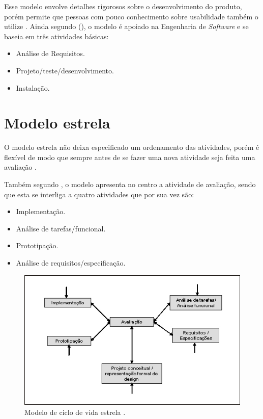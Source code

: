   Esse modelo envolve detalhes rigorosos sobre o desenvolvimento do produto, porém permite que pessoas com pouco conhecimento sobre usabilidade também o utilize \cite{ihc}. 
  Ainda segundo \citeauthor{ihc} (\citeyear{ihc}), o modelo é apoiado na Engenharia de \textit{Software} e se baseia
  em três atividades básicas:
  
  
  \begin{itemize}
    \item Análise de Requisitos.

    \item Projeto/teste/desenvolvimento.

    \item Instalação.     
  \end{itemize}  
  
  
  \section{Modelo estrela}
       
       O modelo estrela não deixa especificado um ordenamento das atividades, porém é flexível  de modo que sempre antes de se fazer uma nova atividade 
       seja feita uma avaliação \cite{guiaderef}.
       
       Também segundo \cite{guiaderef}, o modelo apresenta no centro a atividade de avaliação, sendo que esta se interliga a quatro atividades que 
       por sua vez são:
       
       \begin{itemize}
       \item Implementação.

       \item Análise de tarefas/funcional.

       \item Prototipação.
       
       \item Análise de requisitos/especificação.
       
       \end{itemize}
       
      \begin{figure}[!htb]
      \centering
      \includegraphics[scale=0.55]{figuras/estrela.jpg}
      \caption[Modelo de ciclo de vida estrela]{Modelo de ciclo de vida estrela \cite{ciclovidaestrela}.}
      \end{figure}
    
